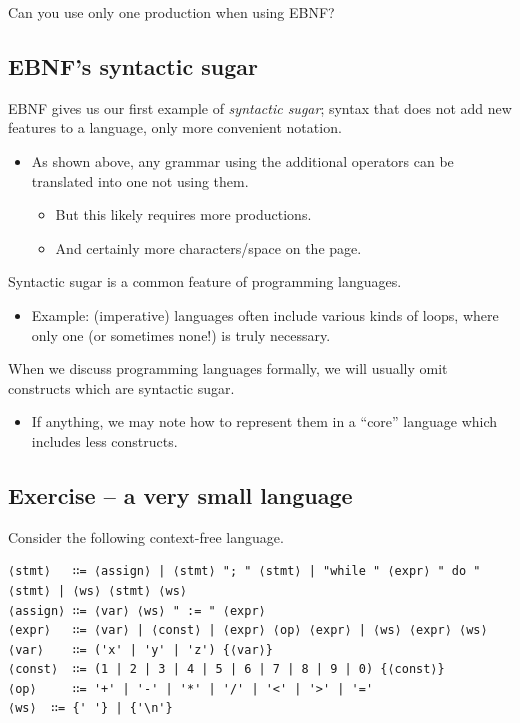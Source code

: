 \documentclass[11pt]{article}
\theoremstyle{definition}
\begin{document}
Can you use only one production when using EBNF?

\subsection{EBNF's syntactic sugar}
\label{sec:org4b153ee}

EBNF gives us our first example of \emph{syntactic sugar};
syntax that does not add new features to a language,
only more convenient notation.
\begin{itemize}
\item As shown above, any grammar using the additional operators
can be translated into one not using them.
\begin{itemize}
\item But this likely requires more productions.
\item And certainly more characters/space on the page.
\end{itemize}
\end{itemize}

Syntactic sugar is a common feature of programming languages.
\begin{itemize}
\item Example: (imperative) languages often include various kinds of loops,
where only one (or sometimes none!) is truly necessary.
\end{itemize}

When we discuss programming languages formally,
we will usually omit constructs which are syntactic sugar.
\begin{itemize}
\item If anything, we may note how to represent them
in a “core” language which includes less constructs.
\end{itemize}

\subsection{Exercise – a very small language}
\label{sec:org647685d}

Consider the following context-free language.
\begin{verbatim}
⟨stmt⟩   ∷= ⟨assign⟩ | ⟨stmt⟩ "; " ⟨stmt⟩ | "while " ⟨expr⟩ " do " ⟨stmt⟩ | ⟨ws⟩ ⟨stmt⟩ ⟨ws⟩
⟨assign⟩ ∷= ⟨var⟩ ⟨ws⟩ " := " ⟨expr⟩
⟨expr⟩   ∷= ⟨var⟩ | ⟨const⟩ | ⟨expr⟩ ⟨op⟩ ⟨expr⟩ | ⟨ws⟩ ⟨expr⟩ ⟨ws⟩
⟨var⟩    ∷= ('x' | 'y' | 'z') {⟨var⟩}
⟨const⟩  ∷= (1 | 2 | 3 | 4 | 5 | 6 | 7 | 8 | 9 | 0) {⟨const⟩}
⟨op⟩     ∷= '+' | '-' | '*' | '/' | '<' | '>' | '='
⟨ws⟩  ∷= {' '} | {'\n'}
\end{verbatim}
\end{document}
